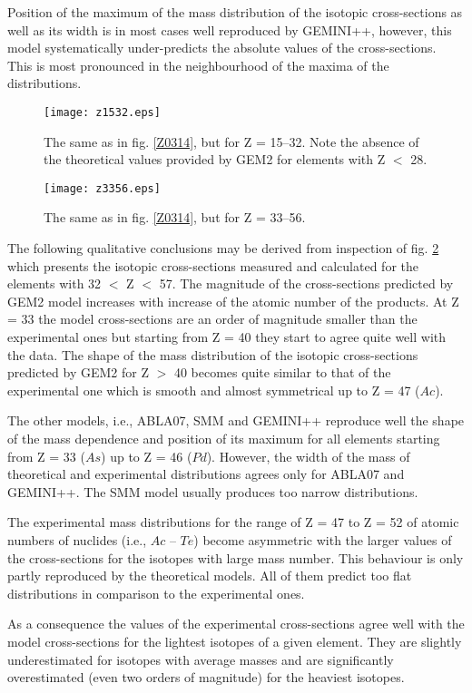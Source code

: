 Position of the maximum of the mass distribution of the isotopic cross-sections as well as its width is in most cases well reproduced by GEMINI++, however, this model systematically under-predicts the absolute values of the cross-sections. This is most pronounced in the neighbourhood of the maxima of the distributions.

\begin{figure}
    \centering
    \texttt{[image: z1532.eps]}
    \caption{The same as in fig. \ref{Z0314}, but for Z = 15–32. Note the absence of the theoretical values provided by GEM2 for elements with Z $<$ 28.}
    \label{Z1532}
\end{figure}
\begin{figure}
    \centering
    \texttt{[image: z3356.eps]}
    \caption{The same as in fig. \ref{Z0314}, but for Z = 33–56.}
    \label{Z3356}
\end{figure}

The following qualitative conclusions may be derived from inspection of fig. \ref{Z3356} which presents the isotopic cross-sections measured and calculated for the elements with 32 $<$ Z $<$ 57. The magnitude of the cross-sections predicted by GEM2 model increases with increase of the atomic number of the products. At Z = 33 the model
cross-sections are an order of magnitude smaller than the experimental ones but starting from Z = 40 they start to agree
quite well with the data. The shape of the mass distribution of the isotopic cross-sections predicted by GEM2 for
Z $>$ 40 becomes quite similar to that of the experimental one which is smooth and almost symmetrical up to Z = 47 ($Ac$). 

The other models, i.e., ABLA07, SMM and GEMINI++ reproduce well the shape of the mass dependence
and position of its maximum for all elements starting from Z = 33 ($As$) up to Z = 46 ($Pd$). However, the width of the mass of theoretical and experimental distributions agrees only for ABLA07 and GEMINI++. The SMM model usually
produces too narrow distributions. 

The experimental mass distributions for the range of Z = 47 to Z = 52 of atomic numbers of nuclides (i.e., $Ac$ – $Te$) become asymmetric with the larger values of the cross-sections for the isotopes with large mass number. This behaviour is only partly reproduced by the theoretical models. All of them predict too flat distributions in comparison to the experimental ones. 

As a consequence the values of the experimental cross-sections agree well with the model cross-sections for the lightest isotopes of a given element. They are slightly underestimated for isotopes with average masses and are significantly overestimated (even two orders of magnitude) for the heaviest isotopes. 

